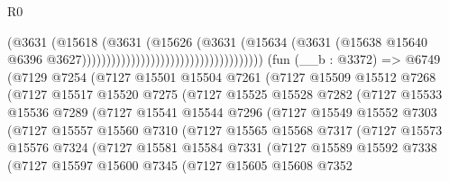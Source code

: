 \begin{lexlean}{R0}
\begin{coremodule}
                                                              (@3631
                                                                (@15618
                                                                  (@3631
                                                                    (@15626
                                                                      (@3631
                                                                        (@15634
                                                                          (@3631
                                                                            (@15638
                                                                              @15640
                                                                              @6396
                                                                              @3627)))))))))))))))))))))))))))))))))))))
    (fun (__b : @3372) =>
    @6749
      (@7129
        @7254
        (@7127
          @15501
          @15504
          @7261
          (@7127
            @15509
            @15512
            @7268
            (@7127
              @15517
              @15520
              @7275
              (@7127
                @15525
                @15528
                @7282
                (@7127
                  @15533
                  @15536
                  @7289
                  (@7127
                    @15541
                    @15544
                    @7296
                    (@7127
                      @15549
                      @15552
                      @7303
                      (@7127
                        @15557
                        @15560
                        @7310
                        (@7127
                          @15565
                          @15568
                          @7317
                          (@7127
                            @15573
                            @15576
                            @7324
                            (@7127
                              @15581
                              @15584
                              @7331
                              (@7127
                                @15589
                                @15592
                                @7338
                                (@7127
                                  @15597
                                  @15600
                                  @7345
                                  (@7127
                                    @15605
                                    @15608
                                    @7352

\end{coremodule}
\end{lexlean}
